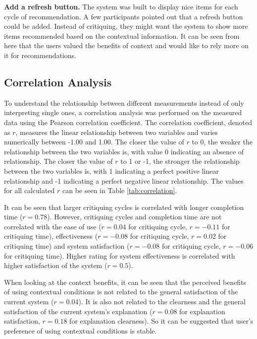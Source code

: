 \textbf{Add a refresh button.} The system was built to display nice items for each cycle of recommendation. A few participants pointed out that a refresh button could be added. Instead of critiquing, they might want the system to show more items recommended based on the contextual information. It can be seen from here that the users valued the benefits of context and would like to rely more on it for recommendations.

\subsection{Correlation Analysis} \label{sec:results_ca}

To understand the relationship between different measurements instead of only interpreting single ones, a correlation analysis was performed on the measured data using the Pearson correlation coefficient. The correlation coefficient, denoted as $r$, measures the linear relationship between two variables and varies numerically between -1.00 and 1.00. The closer the value of $r$ to 0, the weaker the relationship between the two variables is, with value 0 indicating an absence of relationship. The closer the value of $r$ to 1 or -1, the stronger the relationship between the two variables is, with 1 indicating a perfect positive linear relationship and -1 indicating a perfect negative linear relationship. The values for all calculated $r$ can be seen in Table \ref{tab:correlation}.

It can be seen that larger critiquing cycles is correlated with longer completion time ($r=0.78$). However, critiquing cycles and completion time are not correlated with the ease of use ($r=0.04$ for critiquing cycle, $r=-0.11$ for critiquing time), effectiveness ($r=-0.08$ for critiquing cycle, $r=0.02$ for critiquing time) and system satisfaction ($r=-0.08$ for critiquing cycle, $r=-0.06$ for critiquing time). Higher rating for system effectiveness is correlated with higher satisfaction of the system ($r=0.5$). 

When looking at the context benefits, it can be seen that the perceived benefits of using contextual conditions is not related to the general satisfaction of the current system ($r=0.04$). It is also not related to the clearness and the general satisfaction of the current system's explanation ($r=0.08$ for explanation satisfaction, $r=0.18$ for explanation clearness). So it can be suggested that user's preference of using contextual conditions is stable.

